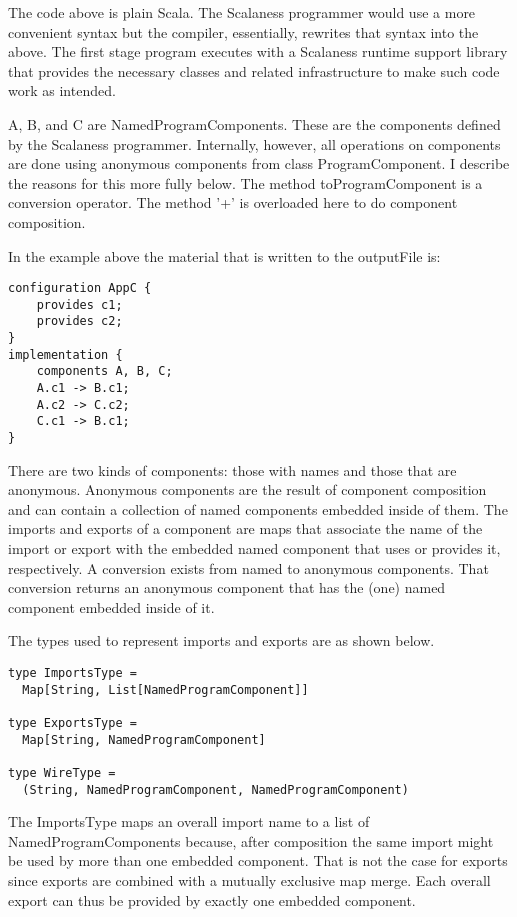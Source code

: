 The code above is plain Scala. The Scalaness programmer would use a more convenient syntax but
the compiler, essentially, rewrites that syntax into the above. The first stage program executes
with a Scalaness runtime support library that provides the necessary classes and related
infrastructure to make such code work as intended.

A, B, and C are NamedProgramComponents. These are the components defined by the Scalaness
programmer. Internally, however, all operations on components are done using anonymous
components from class ProgramComponent. I describe the reasons for this more fully below. The
method toProgramComponent is a conversion operator. The method '+' is overloaded here to do
component composition.

In the example above the material that is written to the outputFile is:

\singlespace
\begin{lstlisting}[language=nesC]
configuration AppC {
    provides c1;
    provides c2;
}
implementation {
    components A, B, C;
    A.c1 -> B.c1;
    A.c2 -> C.c2;
    C.c1 -> B.c1;
}
\end{lstlisting}
\primaryspacing

There are two kinds of components: those with names and those that are anonymous. Anonymous
components are the result of component composition and can contain a collection of named
components embedded inside of them. The imports and exports of a component are maps that
associate the name of the import or export with the embedded named component that uses or
provides it, respectively. A conversion exists from named to anonymous components. That
conversion returns an anonymous component that has the (one) named component embedded inside of
it.

The types used to represent imports and exports are as shown below.

\singlespace
\begin{lstlisting}[language=scalaness]
type ImportsType =
  Map[String, List[NamedProgramComponent]]

type ExportsType =
  Map[String, NamedProgramComponent]

type WireType =
  (String, NamedProgramComponent, NamedProgramComponent)
\end{lstlisting}
\primaryspacing

The ImportsType maps an overall import name to a list of NamedProgramComponents because, after
composition the same import might be used by more than one embedded component. That is not the
case for exports since exports are combined with a mutually exclusive map merge. Each overall
export can thus be provided by exactly one embedded component.

